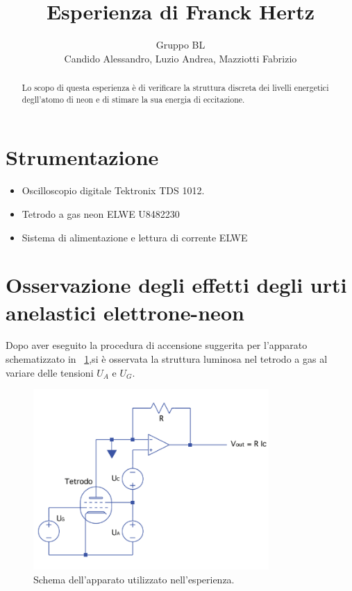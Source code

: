 \documentclass[10pt,a4paper]{article}
\title{Esperienza di Franck Hertz}
\author{Gruppo BL \\ Candido Alessandro, Luzio Andrea, Mazziotti Fabrizio}
\begin{document}
\maketitle

\begin{abstract}
Lo scopo di questa esperienza è di verificare la struttura discreta dei livelli energetici degll'atomo di neon e di stimare la sua energia di eccitazione.
\end{abstract}

\section{Strumentazione }

\begin{itemize}
 \item Oscilloscopio digitale Tektronix TDS 1012.
 \item Tetrodo a gas neon ELWE U8482230
 \item Sistema di alimentazione e lettura di corrente ELWE

\end{itemize}

\section{Osservazione degli effetti degli urti anelastici elettrone-neon}

Dopo aver eseguito la procedura di accensione suggerita per l'apparato schematizzato in \figurename{~\ref{fig:circuito}},si è osservata la struttura luminosa nel tetrodo a gas al variare delle tensioni $U_{A}$ e $U_{G}$.

\begin{figure}[h!]
	\centering
		\includegraphics[width=0.80\textwidth]{../grafici/schema_apparato.png}
	\caption{Schema dell'apparato utilizzato nell'esperienza.}
	\label{fig:circuito}
\end{figure}
\end{document}
